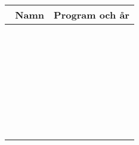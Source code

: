 \documentclass[10pt]{article}
\begin{document}
    \begin{multicols*}{2}
        \begin{table}[H]
        \begin{tabularx}{0.5\textwidth}{|X|p{1.5cm}|}
            \hline
            {\ \newline Namn} & {Program och år} \\ \hline
            &\\ \hline
            &\\ \hline
            &\\ \hline
            &\\ \hline
            &\\ \hline
            &\\ \hline
            &\\ \hline
            &\\ \hline
            &\\ \hline
            &\\ \hline
            &\\ \hline
            &\\ \hline
            &\\ \hline
            &\\ \hline
            &\\ \hline
            &\\ \hline
            &\\ \hline
            &\\ \hline
            &\\ \hline
            &\\ \hline
            &\\ \hline
            &\\ \hline
            &\\ \hline
            &\\ \hline
            &\\ \hline
            &\\ \hline
            &\\ \hline
            &\\ \hline
            &\\ \hline
            &\\ \hline
            &\\ \hline
            &\\ \hline
        \end{tabularx}
        \end{table}

        \vfill
        \columnbreak


\end{multicols*}
\end{document}
